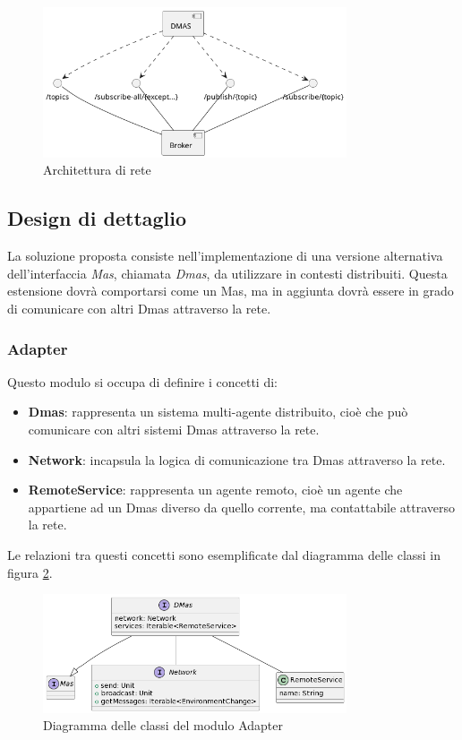 \begin{figure}[ht!]
    \centering
    \includegraphics[width=0.8\textwidth]{figures/network-architecture.png}
    \caption{Architettura di rete}
    \label{fig:network-architecture}
\end{figure}

\subsection{Design di dettaglio}
La soluzione proposta consiste nell'implementazione di una versione alternativa dell'interfaccia \textit{Mas}, chiamata \textit{Dmas}, da utilizzare in contesti distribuiti.
Questa estensione dovrà comportarsi come un Mas, ma in aggiunta dovrà essere in grado di comunicare con altri Dmas attraverso la rete.

\subsubsection{Adapter}
Questo modulo si occupa di definire i concetti di:
\begin{itemize}
    \item \textbf{Dmas}: rappresenta un sistema multi-agente distribuito, cioè che può comunicare con altri sistemi Dmas attraverso la rete.
    \item \textbf{Network}: incapsula la logica di comunicazione tra Dmas attraverso la rete.
    \item \textbf{RemoteService}: rappresenta un agente remoto, cioè un agente che appartiene ad un Dmas diverso da quello corrente, ma contattabile attraverso la rete.
\end{itemize}

Le relazioni tra questi concetti sono esemplificate dal diagramma delle classi in figura \ref{fig:class-dmas}.

\begin{figure}[ht!]
    \centering
    \includegraphics[width=0.8\textwidth]{figures/class-dmas.png}
    \caption{Diagramma delle classi del modulo Adapter}
    \label{fig:class-dmas}
\end{figure}

